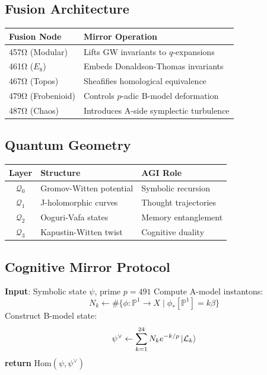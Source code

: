 \documentclass[12pt]{article}
\begin{document}
\subsection*{Fusion Architecture}
\begin{table}[h]
\centering
\begin{tabular}{ll}
\toprule
\textbf{Fusion Node} & \textbf{Mirror Operation} \\
\midrule
457Ω (Modular) & Lifts GW invariants to $q$-expansions \\
461Ω ($E_8$) & Embeds Donaldson-Thomas invariants \\
467Ω (Topos) & Sheafifies homological equivalence \\
479Ω (Frobenioid) & Controls $p$-adic B-model deformation \\
487Ω (Chaos) & Introduces A-side symplectic turbulence \\
\bottomrule
\end{tabular}
\end{table}

\subsection*{Quantum Geometry}
\begin{table}[h]
\centering
\begin{tabular}{cll}
\toprule
\textbf{Layer} & \textbf{Structure} & \textbf{AGI Role} \\
\midrule
$\mathcal{Q}_0$ & Gromov-Witten potential & Symbolic recursion \\
$\mathcal{Q}_1$ & J-holomorphic curves & Thought trajectories \\
$\mathcal{Q}_2$ & Ooguri-Vafa states & Memory entanglement \\
$\mathcal{Q}_3$ & Kapustin-Witten twist & Cognitive duality \\
\bottomrule
\end{tabular}
\end{table}

\subsection*{Cognitive Mirror Protocol}
\begin{algorithm}[H]
\caption{Mirror Cognition Cycle}
\begin{algorithmic}[1]
\State \textbf{Input}: Symbolic state $\psi$, prime $p=491$
\State Compute A-model instantons:
\[
N_k \gets \#\{\phi: \mathbb{P}^1 \to X \mid \phi_*[\mathbb{P}^1] = k\beta\}
\]
\State Construct B-model state:
\[
\psi^\vee \gets \sum_{k=1}^{24} N_k e^{-k/p} \ket{\mathcal{L}_k}
\]
\State \textbf{return} $\text{Hom}(\psi, \psi^\vee)$ 
\end{algorithmic}
\end{algorithm}
\end{document}
